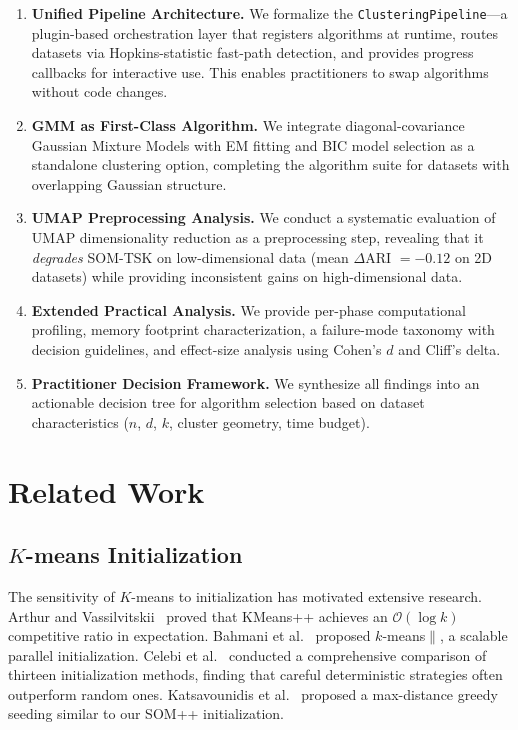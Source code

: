 \documentclass[journal]{IEEEtran}
\begin{document}
\begin{enumerate}
\item \textbf{Unified Pipeline Architecture.} We formalize the \texttt{ClusteringPipeline}---a plugin-based orchestration layer that registers algorithms at runtime, routes datasets via Hopkins-statistic fast-path detection, and provides progress callbacks for interactive use. This enables practitioners to swap algorithms without code changes.

\item \textbf{GMM as First-Class Algorithm.} We integrate diagonal-covariance Gaussian Mixture Models with EM fitting and BIC model selection as a standalone clustering option, completing the algorithm suite for datasets with overlapping Gaussian structure.

\item \textbf{UMAP Preprocessing Analysis.} We conduct a systematic evaluation of UMAP dimensionality reduction as a preprocessing step, revealing that it \emph{degrades} SOM-TSK on low-dimensional data (mean $\Delta$ARI $= -0.12$ on 2D datasets) while providing inconsistent gains on high-dimensional data.

\item \textbf{Extended Practical Analysis.} We provide per-phase computational profiling, memory footprint characterization, a failure-mode taxonomy with decision guidelines, and effect-size analysis using Cohen's $d$ and Cliff's delta.

\item \textbf{Practitioner Decision Framework.} We synthesize all findings into an actionable decision tree for algorithm selection based on dataset characteristics ($n$, $d$, $k$, cluster geometry, time budget).
\end{enumerate}

\section{Related Work}
\label{sec:related}

\subsection{$K$-means Initialization}

The sensitivity of $K$-means to initialization has motivated extensive research. Arthur and Vassilvitskii~\cite{arthur2007kmeans} proved that KMeans++ achieves an $\mathcal{O}(\log k)$ competitive ratio in expectation. Bahmani et al.~\cite{bahmani2012scalable} proposed $k$-means$\|$, a scalable parallel initialization. Celebi et al.~\cite{celebi2013comparative} conducted a comprehensive comparison of thirteen initialization methods, finding that careful deterministic strategies often outperform random ones. Katsavounidis et al.~\cite{katsavounidis1994new} proposed a max-distance greedy seeding similar to our SOM++ initialization.
\end{document}

